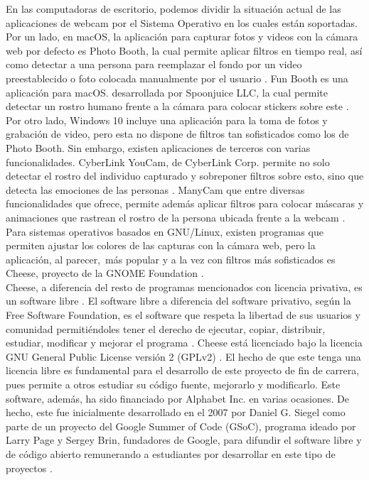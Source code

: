 \documentclass[a4paper,openright,12pt]{report}
\begin{document}
En las computadoras de escritorio, podemos dividir la situación actual de las
aplicaciones de webcam por el Sistema Operativo en los cuales están soportadas.
Por un lado, en macOS, la aplicación para capturar fotos y videos con la cámara
web por defecto es Photo Booth, la cual permite aplicar filtros en tiempo real,
así como detectar a una persona para reemplazar el fondo por un video
preestablecido o foto colocada manualmente por el usuario \cite{photoBooth}. Fun
Booth es una aplicación para macOS. desarrollada por Spoonjuice LLC, la cual
permite detectar un rostro humano frente a la cámara para colocar stickers sobre
este \cite{funBooth}. Por otro lado, Windows 10 incluye una aplicación para la toma de fotos y grabación de
video, pero esta no dispone de filtros tan sofisticados como los de Photo Booth.
Sin embargo, existen aplicaciones de terceros con varias funcionalidades.
CyberLink YouCam, de CyberLink Corp. permite no solo detectar el rostro del
individuo capturado y sobreponer filtros sobre esto, sino que detecta las
emociones de las personas \cite{YouCam7A82}⁠. ManyCam que entre diversas
funcionalidades que ofrece, permite además aplicar filtros para colocar máscaras
y animaciones que rastrean el rostro de la persona ubicada frente a la webcam
\cite{Webcamso75}. Para sistemas operativos basados en GNU/Linux, existen
programas que permiten ajustar los colores de las capturas con la cámara web,
pero la aplicación, al parecer, más popular y a la vez con filtros más
sofisticados es Cheese, proyecto de la GNOME Foundation \cite{AppsChee13}.⁠\\

Cheese, a diferencia del resto de programas mencionados con licencia privativa,
es un software libre \cite{cheeseLicense}⁠. El software libre a diferencia del software privativo,
según la Free Software Foundation, es el software que respeta la libertad de sus
usuarios y comunidad permitiéndoles tener el derecho de ejecutar, copiar,
distribuir, estudiar, modificar y mejorar el programa \cite{whatIsFreeSoftware}⁠.
Cheese está licenciado bajo la licencia GNU General Public License versión 2
(GPLv2) \cite{cheeseLicense}⁠.
El hecho de que este tenga una licencia libre es fundamental para el desarrollo
de este proyecto de fin de carrera, pues permite a otros estudiar su código
fuente, mejorarlo y modificarlo. Este software, además, ha sido financiado por
Alphabet Inc. en varias ocasiones. De hecho, este fue inicialmente desarrollado
en el 2007 por Daniel G. Siegel como parte de un proyecto del Google Summer of
Code (GSoC), programa ideado por Larry Page y Sergey Brin, fundadores de Google,
para difundir el software libre y de código abierto remunerando a estudiantes
por desarrollar en este tipo de proyectos \cite{gsoc1}.\\
\end{document}
